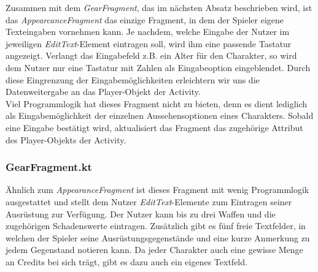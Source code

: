 Zusammen mit dem \textit{GearFragment}, das im nächsten Absatz beschrieben wird, ist das \textit{AppearcanceFragment} das einzige Fragment, in dem der Spieler eigene Texteingaben vornehmen kann. Je nachdem, welche Eingabe der Nutzer im jeweiligen \textit{EditText}-Element eintragen soll, wird ihm eine passende Tastatur angezeigt. Verlangt das Eingabefeld z.B. ein Alter für den Charakter, so wird dem Nutzer nur eine Tastatur mit Zahlen als Eingabeoption eingeblendet. Durch diese Eingrenzung der Eingabemöglichkeiten erleichtern wir uns die Datenweitergabe an das Player-Objekt der Activity.\\

Viel Programmlogik hat dieses Fragment nicht zu bieten, denn es dient lediglich als Eingabemöglichkeit der einzelnen Aussehensoptionen eines Charakters. Sobald eine Eingabe bestätigt wird, aktualisiert das Fragment das zugehörige Attribut des Player-Objekts der Activity.

\subsubsection{GearFragment.kt}
Ähnlich zum \textit{AppearanceFragment} ist dieses Fragment mit wenig Programmlogik ausgestattet und stellt dem Nutzer \textit{EditText}-Elemente zum Eintragen seiner Ausrüstung zur Verfügung. Der Nutzer kann bis zu drei Waffen und die zugehörigen Schadenswerte eintragen. Zusätzlich gibt es fünf freie Textfelder, in welchen der Spieler seine Ausrüstungsgegenstände und eine kurze Anmerkung zu jedem Gegenstand notieren kann. Da jeder Charakter auch eine gewisse Menge an Credits bei sich trägt, gibt es dazu auch ein eigenes Textfeld.

